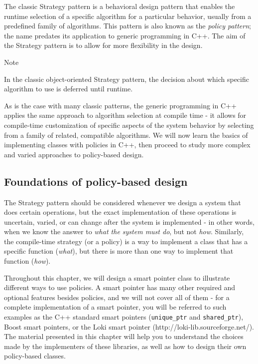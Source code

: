 The classic Strategy pattern is a behavioral design pattern that enables the runtime selection of a specific algorithm for a particular behavior, usually from a predefined family of algorithms. This pattern is also known as the \emph{policy pattern}; the name predates its application to generic programming in C++. The aim of the Strategy pattern is to allow for more flexibility in the design.

Note

In the classic object-oriented Strategy pattern, the decision about which specific algorithm to use is deferred until runtime.

As is the case with many classic patterns, the generic programming in C++ applies the same approach to algorithm selection at compile time - it allows for compile-time customization of specific aspects of the system behavior by selecting from a family of related, compatible algorithms. We will now learn the basics of implementing classes with policies in C++, then proceed to study more complex and varied approaches to policy-based design.

\subsection{Foundations of policy-based design}

The Strategy pattern should be considered whenever we design a system that does certain operations, but the exact implementation of these operations is uncertain, varied, or can change after the system is implemented - in other words, when we know the answer to \emph{what the system must do}, but not \emph{how}. Similarly, the compile-time strategy (or a policy) is a way to implement a class that has a specific function (\emph{what}), but there is more than one way to implement that function (\emph{how}).

Throughout this chapter, we will design a smart pointer class to illustrate different ways to use policies. A smart pointer has many other required and optional features besides policies, and we will not cover all of them - for a complete implementation of a smart pointer, you will be referred to such examples as the C++ standard smart pointers (\texttt{unique\_ptr} and \texttt{shared\_ptr}), Boost smart pointers, or the Loki smart pointer (http://loki-lib.sourceforge.net/). The material presented in this chapter will help you to understand the choices made by the implementers of these libraries, as well as how to design their own policy-based classes.

